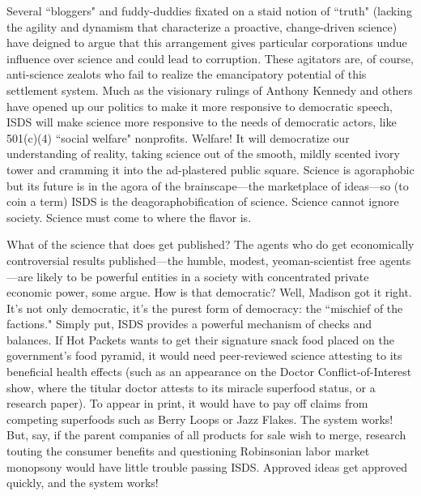 Several ``bloggers" and fuddy-duddies fixated on a staid notion of ``truth" (lacking the agility and dynamism that characterize a proactive, change-driven science) have deigned to argue that this arrangement gives particular corporations undue influence over science and could lead to corruption. These agitators are, of course, anti-science zealots who fail to realize the emancipatory potential of this settlement system. Much as the visionary rulings of Anthony Kennedy and others have opened up our politics to make it more responsive to democratic speech, ISDS will make science more responsive to the needs of democratic actors, like 501(c)(4) ``social welfare" nonprofits. Welfare! It will democratize our understanding of reality, taking science out of the smooth, mildly scented ivory tower and cramming it into the ad-plastered public square. Science is agoraphobic but its future is in the agora of the brainscape---the marketplace of ideas---so (to coin a term) ISDS is the deagoraphobification of science. Science cannot ignore society. Science must come to where the flavor is.

What of the science that does get published? The agents who do get economically controversial results published---the humble, modest, yeoman-scientist free agents---are likely to be powerful entities in a society with concentrated private economic power, some argue. How is that democratic? Well, Madison got it right. It's not only democratic, it's the purest form of democracy: the ``mischief of the factions." Simply put, ISDS provides a powerful mechanism of checks and balances. If Hot Packets wants to get their signature snack food placed on the government's food pyramid, it would need peer-reviewed science attesting to its beneficial health effects (such as an appearance on the Doctor Conflict-of-Interest show, where the titular doctor attests to its miracle superfood status, or a research paper). To appear in print, it would have to pay off claims from competing superfoods such as Berry Loops or Jazz Flakes. The system works! But, say, if the parent companies of all products for sale wish to merge, research touting the consumer benefits and questioning Robinsonian labor market monopsony would have little trouble passing ISDS. Approved ideas get approved quickly, and the system works!

